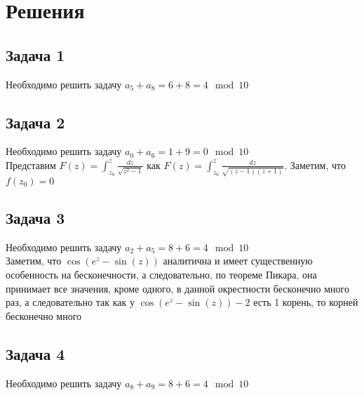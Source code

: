 
\newpage
\section*{Решения}
\subsection*{Задача 1}
	Необходимо решить задачу $a_5 + a_8 = 6 + 8 = 4 \mod 10$\\
\vskip 0.4in

\subsection*{Задача 2}
	Необходимо решить задачу $a_0 + a_6 = 1 + 9 = 0 \mod 10$\\
	Представим $F(z) = \int_{z_{0}}^{z} \frac{dz}{\sqrt{z^2 - 1}}$ как $F(z) = \int_{z_{0}}^{z} \frac{dz}{\sqrt{(z - 1)(z + 1)}}$. Заметим, что $f(z_0) = 0$
\vskip 0.4in

\subsection*{Задача 3}
	Необходимо решить задачу $a_2 + a_5 = 8 + 6 = 4 \mod 10$\\
	Заметим, что $\cos(e^z - \sin(z))$ аналитична и имеет существенную особенность на бесконечности, а следовательно, по теореме Пикара, она принимает все значения, кроме одного, в данной окрестности бесконечно много раз, а следовательно
	 так как у $\cos(e^z - \sin(z)) - 2$ есть 1 корень, то корней бесконечно много
\vskip 0.4in

\subsection*{Задача 4}
	Необходимо решить задачу $a_8 + a_9 = 8 + 6 = 4 \mod 10$\\
	

